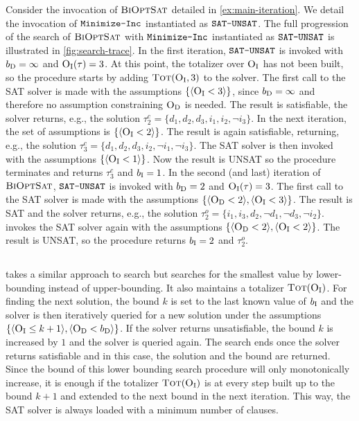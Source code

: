 \begin{example}\label{ex:satunsat}
Consider the invocation of $\textsc{BiOptSat}$ detailed in \cref{ex:main-iteration}. 
We detail the invocation of $\texttt{Minimize-\allowbreak{}Inc}$  instantiated as $\texttt{SAT-UNSAT}$. 
The full progression of the search of $\textsc{BiOptSat}$ with $\texttt{Minimize-\allowbreak{}Inc}$ instantiated as $\texttt{SAT-UNSAT}$ is illustrated in \cref{fig:search-trace}.
In the first iteration, $\texttt{SAT-UNSAT}$ is invoked with $b_{\text{D}} =\infty$ and $\textsc{O}_{\text{I}}(\tau) = 3$.
At this point, the totalizer over $\textsc{O}_{\text{I}}$ has not been built, so the procedure starts by adding $\textsc{Tot}(\textsc{O}_{\text{I}}, 3)$ to the solver.
The first call to the SAT solver is made with the assumptions $\{\langle \textsc{O}_{\text{I}} < 3 \rangle\}$, since $b_{\text{D}}  = \infty$ and therefore no assumption constraining $\textsc{O}_{\text{D}}$ is needed.
The result is satisfiable, the solver returns, e.g.,  the solution $\tau^c_2 = \{d_1, d_2, d_3, i_1, i_2, \lnot i_3\}$. 
In the next iteration, the set of assumptions is $\{\langle \textsc{O}_{\text{I}} < 2 \rangle\}$. The result is again satisfiable, returning, e.g., the solution
$\tau^c_3 = \{ d_1,  d_2, d_3, i_2, \lnot i_1, \lnot i_3\}$. The SAT solver is then invoked with the assumptions  $\{\langle \textsc{O}_{\text{I}} < 1 \rangle\}$. Now the result is UNSAT so 
the procedure terminates and returns $\tau^c_3$ and $b_{\text{I}} = 1$. 
In the second (and last) iteration of $\textsc{BiOptSat}$, $\texttt{SAT-UNSAT}$ is invoked with $b_{\text{D}} = 2$ and $\textsc{O}_{\text{I}}(\tau) = 3$.
The first call to the SAT solver is made with the assumptions $\{ \langle \textsc{O}_{\text{D}} < 2 \rangle, \langle \textsc{O}_{\text{I}} < 3 \rangle\}$.
The result is SAT and the solver returns, e.g., the solution $\tau^o_2 = \{ i_1, i_3, d_2, \lnot d_1, \lnot d_3, \lnot i_2 \}$.
\satunsat{} invokes the SAT solver again with the assumptions $\{ \langle \textsc{O}_{\text{D}} < 2 \rangle, \langle \textsc{O}_{\text{I}} < 2 \rangle \}$.
The result is UNSAT, so the procedure returns $b_{\text{I}} = 2$ and $\tau^o_2$.
\end{example}

\subsection{\unsatsat{}\label{sec:unsat-sat}}

\unsatsat{}takes a similar approach to \satunsat{} search but searches for the smallest value by lower-bounding instead of upper-bounding.
It also maintains a totalizer $\textsc{Tot}(\textsc{O}_{\text{I}})$.
For finding the next solution, the bound $k$ is set to the last known value of $b_{\text{I}}$ and the solver is then iteratively queried for a new solution under the assumptions $\{ \langle \textsc{O}_{\text{I}} \leq k+1 \rangle, \langle \textsc{O}_{\text{D}} < b_{\text{D}} \rangle \}$.
If the solver returns unsatisfiable, the bound $k$ is increased by $1$ and the solver is queried again.
The search ends once the solver returns satisfiable and in this case, the solution and the bound are returned.
Since the bound of this lower bounding search procedure will only monotonically increase, it is enough if the totalizer $\textsc{Tot}(\textsc{O}_{\text{I}})$ is at every step built up to the bound $k+1$ and extended to the next bound in the next iteration.
This way, the SAT solver is always loaded with a minimum number of clauses.

